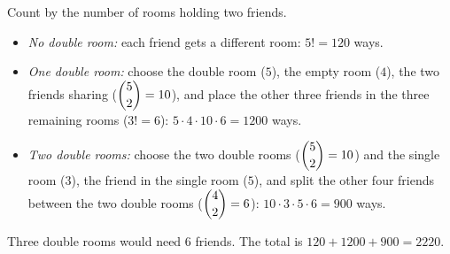 Count by the number of rooms holding two friends.
\begin{itemize}
\item \emph{No double room:} each friend gets a different room: $5!=120$ ways.
\item \emph{One double room:} choose the double room ($5$), the empty room ($4$), the two friends sharing ($\dbinom52=10$), and place the other three friends in the three remaining rooms ($3!=6$): $5\cdot4\cdot10\cdot6=1200$ ways.
\item \emph{Two double rooms:} choose the two double rooms ($\dbinom52=10$) and the single room ($3$), the friend in the single room ($5$), and split the other four friends between the two double rooms ($\dbinom42=6$): $10\cdot3\cdot5\cdot6=900$ ways.
\end{itemize}
Three double rooms would need $6$ friends. The total is $120+1200+900=\boxed{2220}$.
